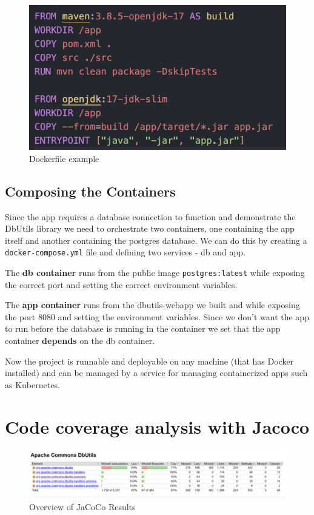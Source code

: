 \documentclass[sigconf]{acmart}
\begin{document}
\begin{figure}
    \centering
    \includegraphics[width=1\linewidth]{images/docker.png}
    \caption{Dockerfile example}
\end{figure}

\subsection*{Composing the Containers}
Since the app requires a database connection to function and demonstrate the DbUtils library we need to orchestrate two containers, one containing the app itself and another containing the postgres database. We can do this by creating a \texttt{docker-compose.yml} file and defining two services - db and app. 

The \textbf{db container} runs from the public image \texttt{postgres:latest} while exposing the correct port and setting the correct environment variables.

The \textbf{app container} runs from the dbutils-webapp we built and while exposing the port 8080 and setting the environment variables. Since we don't want the app to run before the database is running in the container we set that the app container \textbf{depends} on the db container.

Now the project is runnable and deployable on any machine (that has Docker installed) and can be managed by a service for managing containerized apps such as Kubernetes.

\section{Code coverage analysis with Jacoco}

\begin{figure}[H]
    \centering
    \includegraphics[width=1\linewidth]{images/jacoco1.png}
    \caption{Overview of JaCoCo Results}
\end{figure}
\end{document}
